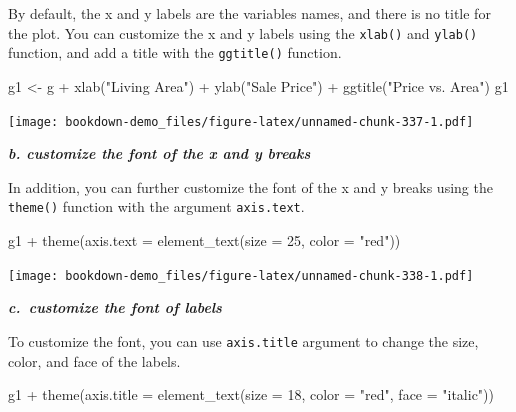 \documentclass[
]{book}
\newenvironment{Shaded}{\begin{snugshade}}{\end{snugshade}}
\newcommand{\AttributeTok}[1]{\textcolor[rgb]{0.77,0.63,0.00}{#1}}
\newcommand{\DecValTok}[1]{\textcolor[rgb]{0.00,0.00,0.81}{#1}}
\newcommand{\FunctionTok}[1]{\textcolor[rgb]{0.00,0.00,0.00}{#1}}
\newcommand{\NormalTok}[1]{#1}
\newcommand{\OtherTok}[1]{\textcolor[rgb]{0.56,0.35,0.01}{#1}}
\newcommand{\SpecialCharTok}[1]{\textcolor[rgb]{0.00,0.00,0.00}{#1}}
\newcommand{\StringTok}[1]{\textcolor[rgb]{0.31,0.60,0.02}{#1}}
\begin{document}
By default, the x and y labels are the variables names, and there is no title for the plot. You can customize the x and y labels using the \texttt{xlab()} and \texttt{ylab()} function, and add a title with the \texttt{ggtitle()} function.

\begin{Shaded}
\begin{Highlighting}[]
\NormalTok{g1 }\OtherTok{\textless{}{-}}\NormalTok{ g }\SpecialCharTok{+} \FunctionTok{xlab}\NormalTok{(}\StringTok{"Living Area"}\NormalTok{) }\SpecialCharTok{+} 
  \FunctionTok{ylab}\NormalTok{(}\StringTok{"Sale Price"}\NormalTok{) }\SpecialCharTok{+} 
  \FunctionTok{ggtitle}\NormalTok{(}\StringTok{"Price vs. Area"}\NormalTok{)}
\NormalTok{g1 }
\end{Highlighting}
\end{Shaded}

\texttt{[image: bookdown-demo\_files/figure-latex/unnamed-chunk-337-1.pdf]}

\textbf{\emph{b. customize the font of the x and y breaks}}

In addition, you can further customize the font of the x and y breaks using the \texttt{theme()} function with the argument \texttt{axis.text}.

\begin{Shaded}
\begin{Highlighting}[]
\NormalTok{g1 }\SpecialCharTok{+} \FunctionTok{theme}\NormalTok{(}\AttributeTok{axis.text =} \FunctionTok{element\_text}\NormalTok{(}\AttributeTok{size =} \DecValTok{25}\NormalTok{, }\AttributeTok{color =} \StringTok{"red"}\NormalTok{))}
\end{Highlighting}
\end{Shaded}

\texttt{[image: bookdown-demo\_files/figure-latex/unnamed-chunk-338-1.pdf]}

\textbf{\emph{c.~customize the font of labels}}

To customize the font, you can use \texttt{axis.title} argument to change the size, color, and face of the labels.

\begin{Shaded}
\begin{Highlighting}[]
\NormalTok{g1 }\SpecialCharTok{+} \FunctionTok{theme}\NormalTok{(}\AttributeTok{axis.title =} \FunctionTok{element\_text}\NormalTok{(}\AttributeTok{size =} \DecValTok{18}\NormalTok{, }\AttributeTok{color =} \StringTok{"red"}\NormalTok{, }\AttributeTok{face =} \StringTok{"italic"}\NormalTok{))}
\end{Highlighting}
\end{Shaded}
\end{document}
